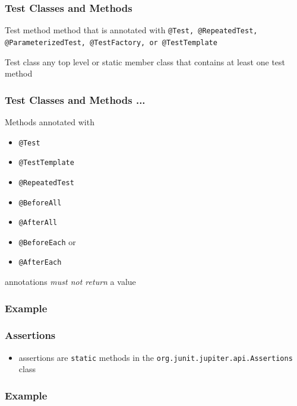 \documentclass{beamer}
\begin{document}
\begin{frame}[fragile]
\frametitle{Test Classes and Methods}

\begin{block}{Test method}
method that is annotated with \texttt{@Test, @RepeatedTest, @ParameterizedTest, @TestFactory, or @TestTemplate}
\end{block}

\begin{block}{Test class}
any top level or static member class that contains at least one test method
\end{block}

\end{frame}


\begin{frame}[fragile]
\frametitle{Test Classes and Methods ...}

Methods annotated with 
\begin{itemize}
\item \texttt{@Test}
\item \texttt{@TestTemplate}
\item \texttt{@RepeatedTest}
\item \texttt{@BeforeAll}
\item \texttt{@AfterAll}
\item \texttt{@BeforeEach} or 
\item \texttt{@AfterEach} 
\end{itemize}
annotations \textit{must not return} a value

\end{frame}


\begin{frame}[fragile]
\frametitle{Example}


\end{frame}


\begin{frame}[fragile]
\frametitle{Assertions}

\begin{itemize}

\item assertions are \texttt{static} methods in the \texttt{org.junit.jupiter.api.Assertions} class

\end{itemize}
\end{frame}


\begin{frame}[fragile]
\frametitle{Example}


\end{frame}
\end{document}
